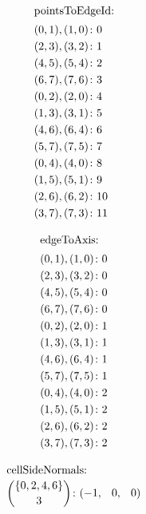 \begin{figure}
\begin{subfigure}[t]{0.25\textwidth}
\begin{align*}
		\end{align*}
	\end{subfigure}%
	\begin{subfigure}[t]{0.25\textwidth}
		\centering
		\begin{align*}
			\shortintertext{pointsToEdgeId:}
			(0, 1), (1, 0) &\colon  0 \\
			(2, 3), (3, 2) &\colon  1 \\
			(4, 5), (5, 4) &\colon  2 \\
			(6, 7), (7, 6) &\colon  3 \\
			(0, 2), (2, 0) &\colon  4 \\
			(1, 3), (3, 1) &\colon  5 \\
			(4, 6), (6, 4) &\colon  6 \\
			(5, 7), (7, 5) &\colon  7 \\
			(0, 4), (4, 0) &\colon  8 \\
			(1, 5), (5, 1) &\colon  9 \\
			(2, 6), (6, 2) &\colon 10 \\
			(3, 7), (7, 3) &\colon 11
		\end{align*}
	\end{subfigure}%
	\begin{subfigure}[t]{0.25\textwidth}
		\centering
		\begin{align*}
			\shortintertext{edgeToAxis:}
			(0, 1), (1, 0) &\colon 0 \\
			(2, 3), (3, 2) &\colon 0 \\
			(4, 5), (5, 4) &\colon 0 \\
			(6, 7), (7, 6) &\colon 0 \\
			(0, 2), (2, 0) &\colon 1 \\
			(1, 3), (3, 1) &\colon 1 \\
			(4, 6), (6, 4) &\colon 1 \\
			(5, 7), (7, 5) &\colon 1 \\
			(0, 4), (4, 0) &\colon 2 \\
			(1, 5), (5, 1) &\colon 2 \\
			(2, 6), (6, 2) &\colon 2 \\
			(3, 7), (7, 3) &\colon 2
		\end{align*}
	\end{subfigure}
	\begin{subfigure}[t]{0.4\textwidth}
		\centering
		\begin{align*}
			\shortintertext{cellSideNormals:}
			\binom{\{0, 2, 4, 6\}}{3} &\colon (         - 1,\phantom{-}0,\phantom{-}0) \\

\end{align*}
\end{subfigure}
\end{figure}
